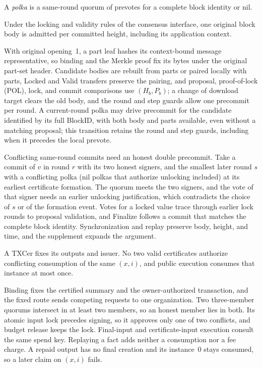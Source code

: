 A \emph{polka} is a same-round quorum of prevotes for a complete block identity or nil.

\begin{lemma}
\label{lem:security-original}
Under the locking and validity rules of the consensus interface, one original block body is admitted per
committed height, including its application context.
\end{lemma}
\begin{IEEEproof}
With original opening~1, a part leaf hashes its context-bound message representative, so binding and the Merkle proof fix its bytes under the original part-set header. Candidate bodies are rebuilt from parts or paired locally with parts, Locked and Valid transfers preserve the pairing, and proposal, proof-of-lock (POL), lock, and commit comparisons use $(H_b,P_b)$; a change of download target clears the old body, and the round and step guards allow one precommit per round. A current-round polka may drive precommit for the candidate identified by its full BlockID, with both body and parts available, even without a matching proposal; this transition retains the round and step guards, including when it precedes the local prevote.

Conflicting same-round commits need an honest double precommit. Take a commit of $v$ in round $r$ with its two honest signers, and the smallest later round $s$ with a conflicting polka (nil polkas that authorize unlocking included) at its earliest certificate formation. The quorum meets the two signers, and the vote of that signer needs an earlier unlocking justification, which contradicts the choice of $s$ or of the formation event. Votes for a locked value trace through earlier lock rounds to proposal validation, and Finalize follows a commit that matches the complete block identity. Synchronization and replay preserve body, height, and time, and the supplement expands the argument.
\end{IEEEproof}

\begin{lemma}
\label{lem:security-consumption}
A TXCer fixes its outputs and issuer. No two valid certificates
authorize conflicting consumption of the same $(x,i)$, and public
execution consumes that instance at most once.
\end{lemma}
\begin{IEEEproof}
Binding fixes the certified summary and the owner-authorized transaction, and the fixed route sends competing requests to one organization. Two three-member quorums intersect in at least two members, so an honest member lies in both. Its atomic input lock precedes signing, so it approves only one of two conflicts, and budget release keeps the lock. Final-input and certificate-input execution consult the same spend key. Replaying a fact adds neither a consumption nor a fee charge. A repaid output has no final creation and its instance~0 stays consumed, so a later claim on $(x,i)$ fails.
\end{IEEEproof}


